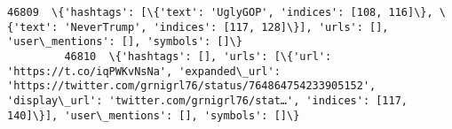 \documentclass[11pt]{article}
\begin{document}
\begin{Verbatim}[commandchars=\\\{\}]
         46809  \{'hashtags': [\{'text': 'UglyGOP', 'indices': [108, 116]\}, \{'text': 'NeverTrump', 'indices': [117, 128]\}], 'urls': [], 'user\_mentions': [], 'symbols': []\}                                                                                                                                                                                                                                                                                                                                                                                                                                                                                                                                                                                                                                                                                                                                                                                                                                                                                                                                                                                                                                                      
         46810  \{'hashtags': [], 'urls': [\{'url': 'https://t.co/iqPWKvNsNa', 'expanded\_url': 'https://twitter.com/grnigrl76/status/764864754233905152', 'display\_url': 'twitter.com/grnigrl76/stat…', 'indices': [117, 140]\}], 'user\_mentions': [], 'symbols': []\}                                                                                                                                                                                                                                                                                                                                                                                                                                                                                                                                                                                                                                                                                                                                                                                                                                                                                                                                                             
         

\end{Verbatim}
\end{document}
